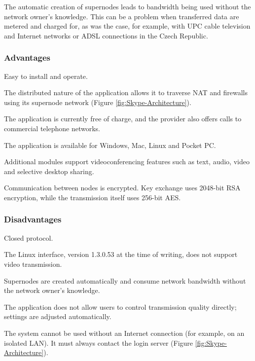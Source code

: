 The automatic creation of supernodes leads to bandwidth being used without the network owner's knowledge. This can be a problem when transferred data are metered and charged for, as was the case, for example, with UPC cable television and Internet networks or ADSL connections in the Czech Republic.

\subsubsection*{Advantages}
\begin{paklist}
\item Easy to install and operate.
\item The distributed nature of the application allows it to traverse NAT and firewalls using its supernode network (Figure \ref{fig:Skype-Architecture}).
\item The application is currently free of charge, and the provider also offers calls to commercial telephone networks.
\item The application is available for Windows, Mac, Linux and Pocket PC.
\item Additional modules support videoconferencing features such as text, audio, video and selective desktop sharing.
\item Communication between nodes is encrypted. Key exchange uses 2048-bit RSA encryption, while the transmission itself uses 256-bit AES.
\end{paklist}

\subsubsection*{Disadvantages}
\begin{paklist}
\item Closed protocol.
\item The Linux interface, version 1.3.0.53 at the time of writing, does not support video transmission.
\item Supernodes are created automatically and consume network bandwidth without the network owner's knowledge.
\item The application does not allow users to control transmission quality directly; settings are adjusted automatically.
\item The system cannot be used without an Internet connection (for example, on an isolated LAN). It must always contact the login server (Figure \ref{fig:Skype-Architecture}).
\end{paklist}

